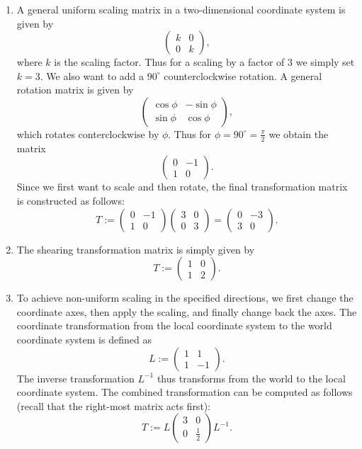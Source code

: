 \documentclass[english]{exercise}
\begin{document}
	\begin{enumerate}
		\item A general uniform scaling matrix in a two-dimensional coordinate system is given by
		\[
			\begin{pmatrix}
				k & 0\\
				0 & k
			\end{pmatrix},
		\]
		where \(k\) is the scaling factor.
		Thus for a scaling by a factor of \(3\) we simply set \(k = 3\).
		We also want to add a \(90^\circ\) counterclockwise rotation. A general rotation matrix is given by
		\[
			\begin{pmatrix}
				\cos\phi & -\sin\phi\\
				\sin\phi & \cos\phi
			\end{pmatrix},
		\]
		which rotates conterclockwise by \(\phi\). Thus for \(\phi = 90^\circ = \frac{\pi}{2}\) we obtain the matrix
		\[
			\begin{pmatrix}
				0 & -1\\
				1 & 0
			\end{pmatrix}.
		\]
		Since we first want to scale and then rotate, the final transformation matrix is constructed as follows:
		\[
			T := \begin{pmatrix}
				0 & -1\\
				1 & 0
			\end{pmatrix}\begin{pmatrix}
				3 & 0\\
				0 & 3
			\end{pmatrix} = \begin{pmatrix}
				0 & -3\\
				3 & 0
			\end{pmatrix}.
		\]
		\item The shearing transformation matrix is simply given by
		\[
			T := \begin{pmatrix}
				1 & 0\\
				1 & 2
			\end{pmatrix}.
		\]
		\item To achieve non-uniform scaling in the specified directions, we first change the coordinate axes, then apply the scaling, and finally change back the axes.
		The coordinate transformation from the local coordinate system to the world coordinate system is defined as
		\[
			L := \begin{pmatrix}
				1 & 1\\
				1 & -1
			\end{pmatrix}.
		\]
		The inverse transformation \(L^{-1}\) thus transforms from the world to the local coordinate system.
		The combined transformation can be computed as follows (recall that the right-most matrix acts first):
		\[
			T := L\begin{pmatrix}
				3 & 0\\
				0 & \frac{1}{2}
			\end{pmatrix}L^{-1}.
		\]
	\end{enumerate}
\end{document}
